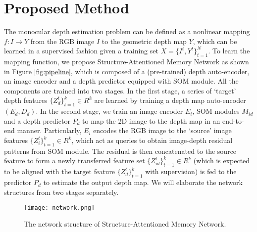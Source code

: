 \documentclass[letterpaper]{article} \usepackage{aaai20}  \usepackage{times}  \usepackage{helvet} \usepackage{courier}  \usepackage{graphicx} \frenchspacing  \setlength{\pdfpagewidth}{8.5in}  \setlength{\pdfpageheight}{11in}  \usepackage{epsfig}
\begin{document}
    \section{Proposed Method}
    \label{sec:proposed}
     The monocular depth estimation problem can be defined as a nonlinear mapping $f: I \rightarrow Y$ from the RGB image $I$ to the geometric depth map $Y$, which can be learned in a supervised fashion given a training set $X = \{I^t,Y^t\}_{t=1}^N$. To learn the mapping function, we propose Structure-Attentioned Memory Network as shown in Figure \ref{fig:pipeline}, which is composed of a (pre-trained) depth auto-encoder, an image encoder and a depth predictor equipped with SOM module. All the components are trained into two stages. In the first stage, a series of `target' depth features $\{Z_d^t\}_{t=1}^k \in R^k$ are learned by training a depth map auto-encoder $(E_d, D_d)$. In the second stage, we train an image encoder $E_i$, SOM modules $M_{id}$ and a depth predictor $P_d$ to map the 2D image to the depth map in an end-to-end manner. Particularly, $E_i$ encodes the RGB image to the `source' image features $\{Z_i^t\}_{t=1}^k \in R^k$, which act as queries to obtain image-depth residual patterns from SOM module. The residual is then concatenated to the source feature to form a newly transferred feature set $\{Z_{id}^t\}_{t=1}^k \in R^k$ (which is expected to be aligned with the target feature $\{Z_d^t\}_{t=1}^k$ with supervision) is fed to the predictor $P_d$ to estimate the output depth map. We will elaborate the network structures  from two stages separately. 
    \begin{figure*}[t]
    \begin{center}
       \texttt{[image: network.png]}
    \end{center}
    \vspace{-13pt}
       \caption{The network structure of Structure-Attentioned Memory Network.}
       \vspace{-10pt}
    \label{fig:network}
    \end{figure*}
    
\end{document}
